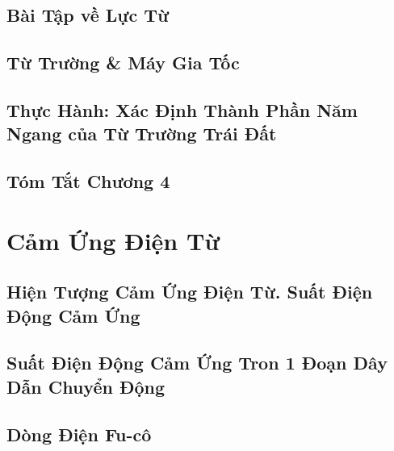 \documentclass[oneside]{book}
\numberwithin{equation}{section}
\begin{document}
\section{Bài Tập về Lực Từ}


\section{Từ Trường \& Máy Gia Tốc}


\section{Thực Hành: Xác Định Thành Phần Năm Ngang của Từ Trường Trái Đất}


\section{Tóm Tắt Chương 4}


\chapter{Cảm Ứng Điện Từ}

\section{Hiện Tượng Cảm Ứng Điện Từ. Suất Điện Động Cảm Ứng}


\section{Suất Điện Động Cảm Ứng Tron 1 Đoạn Dây Dẫn Chuyển Động}


\section{Dòng Điện Fu-cô}
\end{document}
